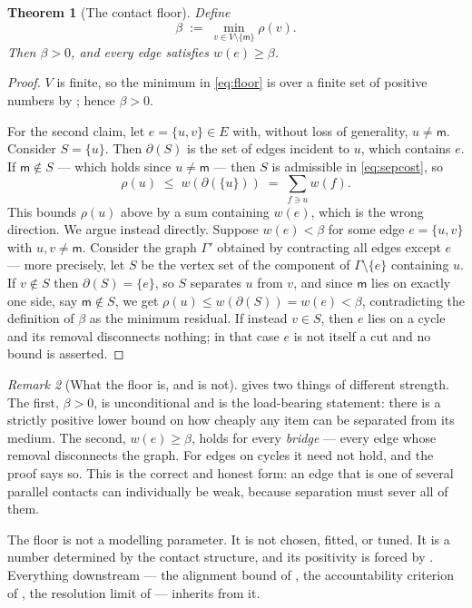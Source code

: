 \documentclass[11pt,twocolumn,a4paper]{article}
\theoremstyle{thmstyle}
\newtheorem{theorem}{Theorem}[section]
\theoremstyle{definition}
\theoremstyle{remark}
\newtheorem{remark}[theorem]{Remark}
\newcommand{\Gph}{\Gamma}
\newcommand{\V}{V}
\newcommand{\E}{E}
\newcommand{\wt}{w}
\newcommand{\med}{\mathsf{m}}
\newcommand{\flo}{\beta}
\newcommand{\cut}{\partial}
\newcommand{\res}{\rho}
\begin{document}
\begin{theorem}[The contact floor]
\label{thm:floor}
Define
\begin{equation}
  \flo \;:=\; \min_{v \in \V \setminus \{\med\}} \res(v).
  \label{eq:floor}
\end{equation}
Then $\flo > 0$, and every edge satisfies $\wt(e) \geq \flo$.
\end{theorem}

\begin{proof}
$\V$ is finite, so the minimum in \eqref{eq:floor} is over a finite
set of positive numbers by ; hence $\flo > 0$.

For the second claim, let $e = \{u,v\} \in \E$ with, without loss of
generality, $u \neq \med$. Consider $S = \{u\}$. Then $\cut(S)$ is the
set of edges incident to $u$, which contains $e$. If $\med \notin S$
--- which holds since $u \neq \med$ --- then $S$ is admissible in
\eqref{eq:sepcost}, so
\[
  \res(u) \;\leq\; \wt(\cut(\{u\}))
        \;=\; \sum_{f \ni u} \wt(f).
\]
This bounds $\res(u)$ above by a sum containing $\wt(e)$, which is the
wrong direction. We argue instead directly. Suppose $\wt(e) < \flo$
for some edge $e = \{u,v\}$ with $u,v \neq \med$. Consider the graph
$\Gph'$ obtained by contracting all edges except $e$ --- more
precisely, let $S$ be the vertex set of the component of
$\Gph \setminus \{e\}$ containing $u$. If $v \notin S$ then
$\cut(S) = \{e\}$, so $S$ separates $u$ from $v$, and since $\med$
lies on exactly one side, say $\med \notin S$, we get
$\res(u) \leq \wt(\cut(S)) = \wt(e) < \flo$, contradicting the
definition of $\flo$ as the minimum residual. If instead $v \in S$,
then $e$ lies on a cycle and its removal disconnects nothing; in that
case $e$ is not itself a cut and no bound is asserted.
\end{proof}

\begin{remark}[What the floor is, and is not]
\label{rem:floor-meaning}
 gives two things of different strength. The first,
$\flo > 0$, is unconditional and is the load-bearing statement: there
is a strictly positive lower bound on how cheaply any item can be
separated from its medium. The second, $\wt(e) \geq \flo$, holds for
every \emph{bridge} --- every edge whose removal disconnects the
graph. For edges on cycles it need not hold, and the proof says so.
This is the correct and honest form: an edge that is one of several
parallel contacts can individually be weak, because separation must
sever all of them.

The floor is not a modelling parameter. It is not chosen, fitted, or
tuned. It is a number determined by the contact structure, and its
positivity is forced by . Everything downstream
--- the alignment bound of , the accountability
criterion of , the resolution limit of
 --- inherits from it.
\end{remark}
\end{document}
